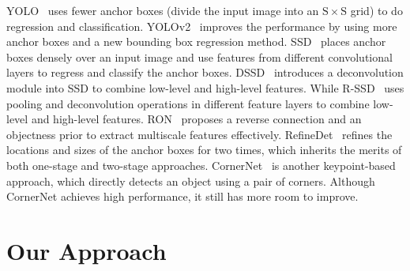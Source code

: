 \documentclass[10pt,twocolumn,letterpaper]{article}
\begin{document}
YOLO~\cite{redmon2016you} uses fewer anchor boxes (divide the input image into an $\mathrm{S}\times\mathrm{S}$ grid) to do regression and classification. YOLOv2~\cite{redmon2017yolo9000} improves the performance by using more anchor boxes and a new bounding box regression method. SSD~\cite{liu2016ssd} places anchor boxes densely over an input image and use features from different convolutional layers to regress and classify the anchor boxes. DSSD~\cite{fu2017dssd} introduces a deconvolution module into SSD to combine low-level and high-level features. While R-SSD~\cite{jeong2017enhancement} uses pooling and deconvolution operations in different feature layers to combine low-level and high-level features. RON~\cite{kong2017ron} proposes a reverse connection and an objectness prior to extract multiscale features effectively. RefineDet~\cite{zhang2018single} refines the locations and sizes of the anchor boxes for two times, which inherits the merits of both one-stage and two-stage approaches. CornerNet~\cite{law2018cornernet} is another keypoint-based approach, which directly detects an object using a pair of corners. Although CornerNet achieves high performance, it still has more room to improve.

\section{Our Approach}
\label{Approach}
\end{document}

